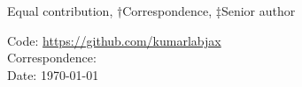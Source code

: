 \documentclass[11pt,onecolumn]{article}
\begin{document}
\begin{titlebox}
\vspace{0.2in}

{\metadatalabelfont *Equal contribution, †Correspondence, ‡Senior author}

{\metadatalabelfont Code:} {\metadatatextfont\href{https://github.com/kumarlabjax}{https://github.com/kumarlabjax}} \\
{\metadatalabelfont Correspondence:} {} \\
{\metadatalabelfont Date:} {\metadatatextfont \today}

\end{titlebox}


% 















\end{document}
